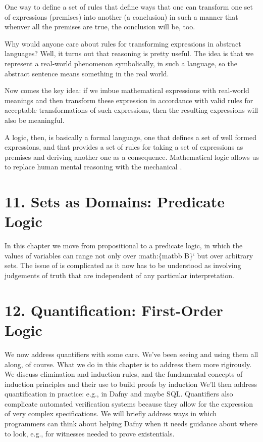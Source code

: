 \documentclass[letterpaper,10pt,english]{sphinxmanual}
\begin{document}
One way to define a set of  rules that define ways that one
can transform one set of expressions (premises) into another (a
conclusion) in such a manner that whenver all the premises are true,
the conclusion will be, too.

Why would anyone care about rules for transforming expressions in
abstract languages? Well, it turns out that  reasoning is
pretty useful. The idea is that we represent a real-world phenomenon
symbolically, in such a language, so the abstract sentence means
something in the real world.

Now comes the key idea: if we imbue mathematical expressions with
real-world meanings and then transform these expression in accordance
with valid rules for acceptable transformations of such expressions,
then the resulting expressions will also be meaningful.

A logic, then, is basically a formal language, one that defines a set
of well formed expressions, and that provides a set of 
rules for taking a set of expressions as premises and deriving another
one as a consequence. Mathematical logic allows us to replace human
mental reasoning with the mechanical .


\chapter{11. Sets as Domains: Predicate Logic}
\label{\detokenize{11-predicate-logic:sets-as-domains-predicate-logic}}\label{\detokenize{11-predicate-logic::doc}}
In this chapter we move from propositional to a predicate logic, in
which the values of variables can range not only over :math:\{matbb
B\}{}` but over arbitrary sets. The issue of  is complicated as
it now has to be understood as involving judgements of truth that are
independent of any particular interpretation.


\chapter{12. Quantification: First-Order Logic}
\label{\detokenize{12-quantification::doc}}\label{\detokenize{12-quantification:quantification-first-order-logic}}
We now address quantifiers with some care.  We’ve been seeing and
using them all along, of course. What we do in this chapter is to
address them more rigirously. We discuss elimination and induction
rules, and the fundamental concepts of induction principles and their
use to build proofs by induction We’ll then address quantification in
practice: e.g., in Dafny and maybe SQL. Quantifiers also complicate
automated verification systems because they allow for the expression
of very complex specifications. We will briefly address ways in which
programmers can think about helping Dafny when it needs guidance about
where to look, e.g., for witnesses needed to prove existentials.
\end{document}
